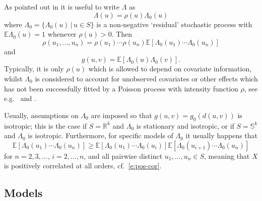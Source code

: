 \documentclass[alpha-refs]{wiley-article}
\begin{document}
As pointed out in \citet{MW07} it is useful to write $\Lambda$ as
\begin{equation}\label{e:Lambda}
\Lambda(u)=\rho(u)\Lambda_0(u)
\end{equation}
where $\Lambda_0=\{\Lambda_0(u)\,|\,u\in S\}$ is a non-negative `residual' stochastic process with $\mathbb E\Lambda_0(u)=1$ whenever $\rho(u)>0$.
Then
\[\rho(u_1,\ldots,u_n)=\rho(u_1)\cdots\rho(u_n)\mathbb E\left[\Lambda_0(u_1)\cdots\Lambda_0(u_n)\right]\]
and %
 \begin{equation}\label{e:g-Lambda0}
 g(u,v)=\mathbb E\left[\Lambda_0(u)\Lambda_0(v)\right].
 \end{equation}
Typically, it is only $\rho(u)$ which is allowed to depend on covariate information, whilst $\Lambda_0$ is considered to account for unobserved covariates or other effects which has not been successfully fitted by a Poisson process with intensity function $\rho$, see e.g.\ \citet{MW07} and \citet{Diggle}. 

Usually, assumptions on $\Lambda_0$ are imposed so that $g(u,v)=g_0(d(u,v))$ is isotropic; this is the case if $S=\mathbb R^k$ and
$\Lambda_0$ is stationary and isotropic, or if $S=\mathbb S^k$ and $\Lambda_0$ is isotropic. 
Furthermore, for specific models of $\Lambda_0$ it usually happens that 
\begin{equation}\label{e:all-orders}
\mathbb E\left[\Lambda_0(u_1)\cdots\Lambda_0(u_n)\right]\ge\mathbb E\left[\Lambda_0(u_1)\cdots\Lambda_0(u_i)\right]\mathbb E\left[\Lambda_0(u_{i+1})\cdots\Lambda_0(u_n)\right]
\end{equation}
for $n=2,3,\ldots$, $i=2,\ldots,n$, and all pairwise distinct $u_1,\ldots,u_n\in S$, meaning that
$X$ is positively correlated at all orders, 
 cf.\ \eqref{e:pos-cor}. 



\subsection{Models}\label{s:models}
\end{document}

